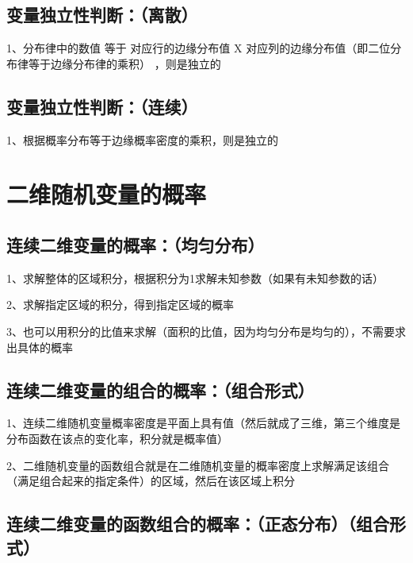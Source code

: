 \subsection{变量独立性判断：（离散）}

1、分布律中的数值 等于 对应行的边缘分布值 X 对应列的边缘分布值（即二位分布律等于边缘分布律的乘积） ，则是独立的



\subsection{变量独立性判断：（连续）}

1、根据概率分布等于边缘概率密度的乘积，则是独立的

\section{二维随机变量的概率}



\subsection{连续二维变量的概率：（均匀分布）}

1、求解整体的区域积分，根据积分为1求解未知参数（如果有未知参数的话）

2、求解指定区域的积分，得到指定区域的概率

3、也可以用积分的比值来求解（面积的比值，因为均匀分布是均匀的），不需要求出具体的概率



\subsection{连续二维变量的组合的概率：（组合形式）}

1、连续二维随机变量概率密度是平面上具有值（然后就成了三维，第三个维度是分布函数在该点的变化率，积分就是概率值）

2、二维随机变量的函数组合就是在二维随机变量的概率密度上求解满足该组合（满足组合起来的指定条件）的区域，然后在该区域上积分



\subsection{连续二维变量的函数组合的概率：（正态分布）（组合形式）}


